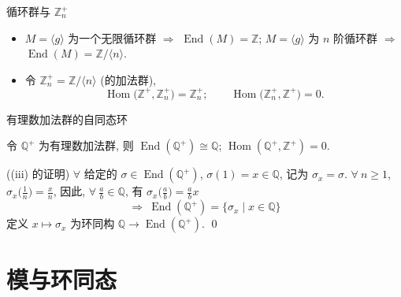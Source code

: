 
\begin{frame}{循环群与 $\mathbb{Z}_n^+$}

\begin{eg}
\begin{itemize}
\item[(1)] $M = \langle g \rangle$ 为一个无限循环群
  $\Longrightarrow$ $\operatorname{End}(M) = \mathbb{Z}$;
  $M = \langle g \rangle$ 为 $n$ 阶循环群
  $\Longrightarrow$ $\operatorname{End}(M) = \mathbb{Z}/\langle n \rangle$.
\item[(ii)] 令 $\mathbb{Z}_n^+ = \mathbb{Z}/\langle n \rangle$ (的加法群),
  \[
  \operatorname{Hom} \big( \mathbb{Z}^+, \mathbb{Z}_n^+ \big) = \mathbb{Z}_n^+ ;
  \qquad
  \operatorname{Hom} \big( \mathbb{Z}_n^+, \mathbb{Z}^+ \big) = 0 .
  \]
\end{itemize}
\end{eg}

\end{frame}


\begin{frame}{有理数加法群的自同态环}

\begin{eg}[有理数加法群]
令 $\mathbb{Q}^+$ 为有理数加法群, 则
$\operatorname{End}(\mathbb{Q}^+) \cong \mathbb{Q}$;
$\operatorname{Hom}(\mathbb{Q}^+, \mathbb{Z}^+) = 0$.
\end{eg}

\startproof[bg=yellow, fg=red]((iii) 的证明)
$\forall$ 给定的 $\sigma \in \operatorname{End}(\mathbb{Q}^+)$,
$\sigma(1) = x \in \mathbb{Q}$, 记为 $\sigma_x = \sigma$.
$\forall\ n \geqslant 1$, $\sigma_x \big( \tfrac{1}{n} \big) = \tfrac{x}{n}$,
因此, $\forall\ \tfrac{a}{b} \in \mathbb{Q}$, 有
$\sigma_x \big( \tfrac{a}{b} \big) = \tfrac{a}{b} x$
\[
\Longrightarrow\ \operatorname{End}(\mathbb{Q}^+) = \big\{ \sigma_x \;\big|\; x \in \mathbb{Q} \big\}
\]
定义 $x \mapsto \sigma_x$ 为环同构 $\mathbb{Q} \to \operatorname{End}(\mathbb{Q}^+)$.
\qed

\end{frame}


\section[模与同态]{模与环同态}

